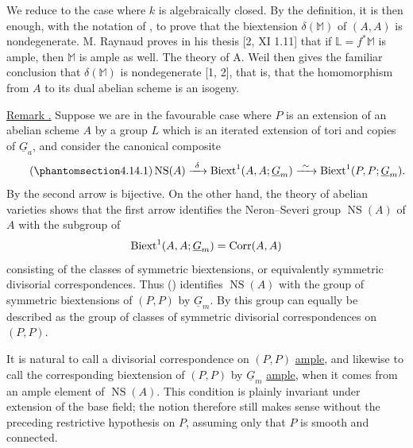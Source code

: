 We reduce to the case where $k$ is algebraically closed.  By the
definition, it is then enough, with the notation of , to prove
that the biextension $\delta(\mathbb M)$ of $(A,A)$ is
nondegenerate.  M. Raynaud proves in his thesis [2, XI 1.11] that if
$\mathbb L=f^*\mathbb M$ is ample, then $\mathbb M$ is ample as
well.  The theory of A. Weil then gives the familiar conclusion that
$\delta(\mathbb M)$ is nondegenerate [1, 2], that is, that the
homomorphism from $A$ to its dual abelian scheme is an isogeny.

\medskip
\noindent\underline{Remark .}  Suppose we are in the favourable
case where $P$ is an extension of an abelian scheme $A$ by a group
$L$ which is an iterated extension of tori and copies of
$\underline G_a$, and consider the canonical composite
\begin{equation}\tag{\SGARefTarget{sga7.sga7i.eviii.n4-14-1}{4.14.1}}
 \operatorname{NS}(A)
 \xrightarrow{\ \delta\ }
 \Biext^1(A,A;\underline G_m)
 \xrightarrow{\ \sim\ }
 \Biext^1(P,P;\underline G_m).
\end{equation}
By  the second arrow is bijective.  On the other hand, the theory
of abelian varieties shows that the first arrow identifies the
Neron--Severi group $\operatorname{NS}(A)$ of $A$ with the subgroup
of
\[
 \Biext^1(A,A;\underline G_m)=\operatorname{Corr}(A,A)
\]
consisting of the classes of symmetric biextensions, or equivalently
symmetric divisorial correspondences.  Thus () identifies
$\operatorname{NS}(A)$ with the group of symmetric biextensions of
$(P,P)$ by $\underline G_m$.  By  this group can equally be
described as the group of classes of symmetric divisorial
correspondences on $(P,P)$.

It is natural to call a divisorial correspondence on $(P,P)$
\underline{ample}, and likewise to call the corresponding
biextension of $(P,P)$ by $\underline G_m$ \underline{ample}, when
it comes from an ample element of $\operatorname{NS}(A)$.  This
condition is plainly invariant under extension of the base field;
the notion therefore still makes sense without the preceding
restrictive hypothesis on $P$, assuming only that $P$ is smooth and
connected.

